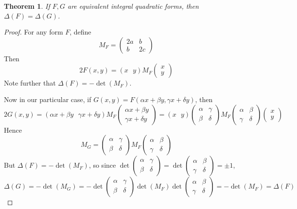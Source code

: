 \documentclass[12pt]{article}
\newtheorem{thm}{Theorem}
\theoremstyle{definition}
\begin{document}
\begin{thm}If $F, G$ are equivalent integral quadratic forms, then $\Delta(F)=\Delta(G)$.
\end{thm}
\begin{proof}
For any form $F$, define
\[
M_F=\left( \begin{array}{cc}
2a & b \\
b & 2c
\end{array}\right)
\]
Then 
\[
2F(x,y)=(x\text{ }y)M_F\left(\begin{array}{c} x \\
y\end{array}\right)
\]
Note further that $\Delta(F)=-\det(M_F)$.

Now in our particular case, if $G(x,y)=F(\alpha x + \beta y, \gamma x+\delta y)$, then 
\[
2G(x,y) = (\alpha x + \beta y\text{  } \gamma x+\delta y)M_F\left(\begin{array}{c} \alpha x + \beta y \\
\gamma x+\delta y\end{array}\right)=(x\text{ }y)\left( \begin{array}{cc}
\alpha & \gamma \\
\beta & \delta
\end{array}\right)M_F\left( \begin{array}{cc}
\alpha & \beta \\
\gamma & \delta
\end{array}\right)\left(\begin{array}{c} x \\
y\end{array}\right)
\]
Hence 
\[
M_G = \left( \begin{array}{cc}
\alpha & \gamma \\
\beta & \delta
\end{array}\right) M_F \left( \begin{array}{cc}
\alpha & \beta \\
\gamma & \delta
\end{array}\right)
\]
But $\Delta(F) = -\det(M_F)$, so since $\det\left( \begin{array}{cc}
\alpha & \gamma \\
\beta & \delta
\end{array}\right)=\det\left( \begin{array}{cc}
\alpha & \beta \\
\gamma & \delta
\end{array}\right)=\pm1$,
	\[
\Delta(G)=-\det(M_G)=-\det\left( \begin{array}{cc}
\alpha & \gamma \\
\beta & \delta
\end{array}\right)\det(M_F)\det\left( \begin{array}{cc}
\alpha & \beta \\
\gamma & \delta
\end{array}\right)=-\det(M_F)=\Delta(F)
\]
\end{proof}
\end{document}
